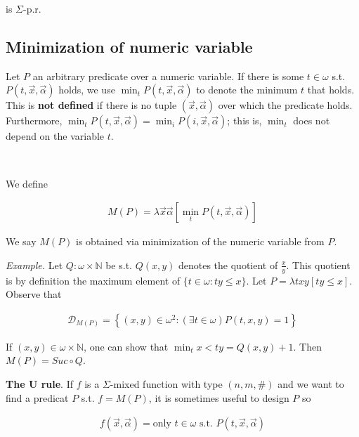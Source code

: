 \documentclass[a4paper, 12pt]{article}
\begin{document}
is $\Sigma$-p.r.


\subsection{Minimization of numeric variable}

Let $P$ an arbitrary predicate over a numeric variable. If there is some $t \in
\omega$ s.t. $P(t, \overrightarrow{x}, \overrightarrow{\alpha})$ holds, we use
$\min_{t} P(t, \overrightarrow{x}, \overrightarrow{\alpha})$ to denote the
minimum $t$ that holds. This is \textbf{not defined} if there is no tuple
$(\overrightarrow{x}, \overrightarrow{\alpha})$ over which the predicate holds.
Furthermore, $\min_t P(t, \overrightarrow{x}, \overrightarrow{\alpha}) = \min_i
P(i, \overrightarrow{x}, \overrightarrow{\alpha})$; this is, $\min_t$ does not
depend on the variable $t$.

~ 

We define 

\begin{align*}
    M(P) = \lambda \overrightarrow{x}\overrightarrow{\alpha} \left[ \min_t P(t,
    \overrightarrow{x}, \overrightarrow{\alpha}) \right] 
\end{align*}

We say $M(P)$ is obtained via minimization of the numeric variable from $P$.

\textit{Example.} Let $Q : \omega \times \mathbb{N}$ be s.t. $Q(x, y)$ denotes
the quotient of $\frac{x}{y}$. This quotient is by definition the maximum
element of $\{t \in \omega : ty \leq x\}$. Let $P = \lambda txy \left[ ty \leq x
\right] $. Observe that 

\begin{align*}
    \mathcal{D}_{M(P)} = \left\{ (x, y) \in \omega^2 : (\exists t \in \omega)
    P(t, x, y) = 1 \right\} 
\end{align*}

If $(x, y) \in \omega \times \mathbb{N}$, one can show that $\min_t x < ty =
Q(x, y) + 1$. Then $M(P) = Suc \circ Q$.

\textbf{The U rule}. If $f$ is a $\Sigma$-mixed function with type $(n, m, \#)$
and we want to find a predicat $P$ s.t. $f = M(P)$, it is sometimes useful to
design $P$ so  

\begin{align*}
    f(\overrightarrow{x}, \overrightarrow{\alpha}) = \text{only } t \in \omega
    \text{ s.t. } P(t, \overrightarrow{x}, \overrightarrow{\alpha})
\end{align*}
\end{document}
